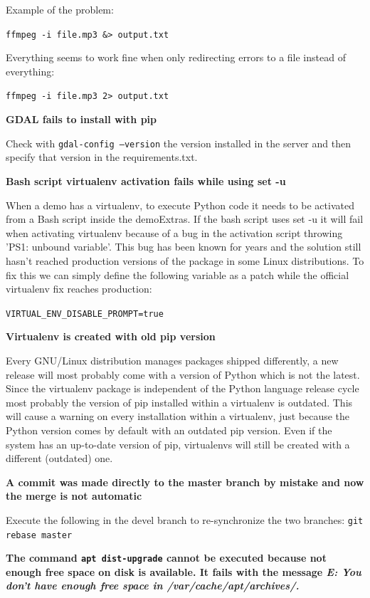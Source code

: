 \documentclass[a4paper,12pt]{article}
\begin{document}
Example of the problem:

{\tt ffmpeg -i file.mp3 \&> output.txt}

Everything seems to work fine when only redirecting errors to a file instead of everything:

{\tt ffmpeg -i file.mp3 2> output.txt}

\textbf{GDAL fails to install with pip}

Check with {\tt gdal-config --version} the version installed in the server and then specify that version in the requirements.txt.

\textbf{Bash script virtualenv activation fails while using set -u}

When a demo has a virtualenv, to execute Python code it needs to be activated from a Bash script inside the demoExtras. If the bash script uses set -u it will fail when activating virtualenv because of a bug in the activation script throwing 'PS1: unbound variable'. This bug has been known for years and the solution still hasn't reached production versions of the package in some Linux distributions. To fix this we can simply define the following variable as a patch while the official virtualenv fix reaches production:

{\tt VIRTUAL\_ENV\_DISABLE\_PROMPT=true}

\textbf{Virtualenv is created with old pip version}

Every GNU/Linux distribution manages packages shipped differently, a new release will most probably come with a version of Python which is not the latest. Since the virtualenv package is independent of the Python language release cycle most probably the version of pip installed within a virtualenv is outdated. This will cause a warning on every installation within a virtualenv, just because the Python version comes by default with an outdated pip version. Even if the system has an up-to-date version of pip, virtualenvs will still be created with a different (outdated) one.

\textbf{A commit was made directly to the master branch by mistake and now the merge is not automatic}

Execute the following in the devel branch to re-synchronize the two branches: {\tt git rebase master}

\textbf{The command {\tt apt dist-upgrade} cannot be executed because not enough free space on disk is available. It fails with the message \emph{E: You don't have enough free space in /var/cache/apt/archives/.}}
\end{document}
